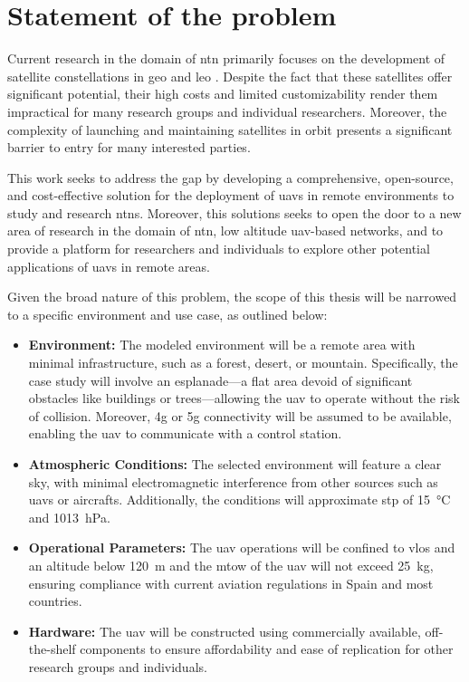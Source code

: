 
\chapter{Statement of the problem}\label{ch:statement_of_problem}

Current research in the domain of \gls{ntn} primarily focuses on the development of satellite constellations in \gls{geo} and \gls{leo} \autocite{non_terrestial_networks_trends}. Despite the fact that these satellites offer significant potential, their high costs and limited customizability render them impractical for many research groups and individual researchers. Moreover, the complexity of launching and maintaining satellites in orbit presents a significant barrier to entry for many interested parties.

This work seeks to address the gap by developing a comprehensive, open-source, and cost-effective solution for the deployment of \glspl{uav} in remote environments to study and research \glspl{ntn}. Moreover, this solutions seeks to open the door to a new area of research in the domain of \gls{ntn}, low altitude \gls{uav}-based networks, and to provide a platform for researchers and individuals to explore other potential applications of \glspl{uav} in remote areas.

Given the broad nature of this problem, the scope of this thesis will be narrowed to a specific environment and use case, as outlined below:

\begin{itemize}
  \item \textbf{Environment:} The modeled environment will be a remote area with minimal infrastructure, such as a forest, desert, or mountain. Specifically, the case study will involve an esplanade—a flat area devoid of significant obstacles like buildings or trees—allowing the \gls{uav} to operate without the risk of collision. Moreover, \gls{4g} or \gls{5g} connectivity will be assumed to be available, enabling the \gls{uav} to communicate with a control station.

  \item \textbf{Atmospheric Conditions:} The selected environment will feature a clear sky, with minimal electromagnetic interference from other sources such as \glspl{uav} or aircrafts. Additionally, the conditions will approximate \gls{stp} of \SI{15}{\degreeCelsius} and \SI{1013}{\hecto\pascal}.

  \item \textbf{Operational Parameters:} The \gls{uav} operations will be confined to \gls{vlos} and an altitude below \SI{120}{\metre} and the \gls{mtow} of the \gls{uav} will not exceed \SI{25}{\kilogram}, ensuring compliance with current aviation regulations in Spain and most countries.

  \item \textbf{Hardware:} The \gls{uav} will be constructed using commercially available, off-the-shelf components to ensure affordability and ease of replication for other research groups and individuals.
\end{itemize}
